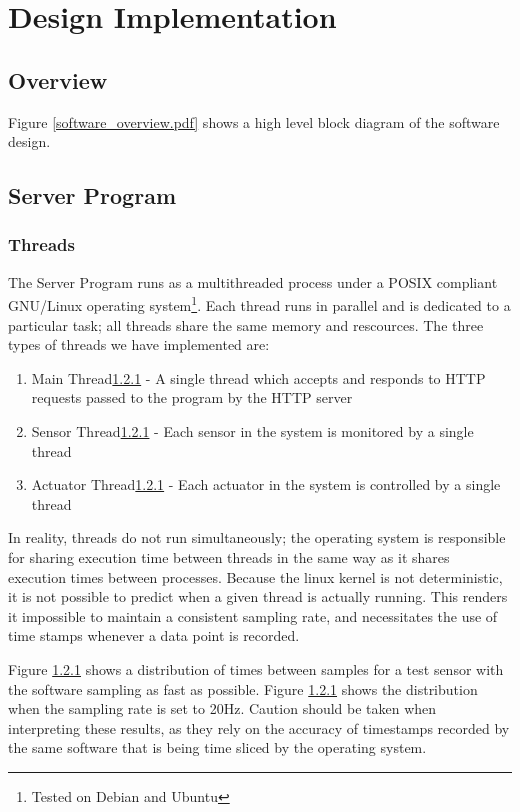 \chapter{Design Implementation}

\section{Overview}

Figure \ref{software_overview.pdf} shows a high level block diagram of the software design.


\section{Server Program}

\subsection{Threads}

The Server Program runs as a multithreaded process under a POSIX compliant GNU/Linux operating system\footnote{Tested on Debian and Ubuntu}. Each thread runs in parallel and is dedicated to a particular task; all threads share the same memory and rescources. The three types of threads we have implemented are:
\begin{enumerate}
  \item Main Thread\ref{} - A single thread which accepts and responds to HTTP requests passed to the program by the HTTP server
  \item Sensor Thread\ref{} - Each sensor in the system is monitored by a single thread
  \item Actuator Thread\ref{} - Each actuator in the system is controlled by a single thread
\end{enumerate}

In reality, threads do not run simultaneously; the operating system is responsible for sharing execution time between threads in the same way as it shares execution times between processes. Because the linux kernel is not deterministic, it is not possible to predict when a given thread is actually running. This renders it impossible to maintain a consistent sampling rate, and necessitates the use of time stamps whenever a data point is recorded.

Figure \ref{} shows a distribution of times between samples for a test sensor with the software sampling as fast as possible. 
Figure \ref{} shows the distribution when the sampling rate is set to 20Hz. Caution should be taken when interpreting these results, as they rely on the accuracy of timestamps recorded by the same software that is being time sliced by the operating system.


